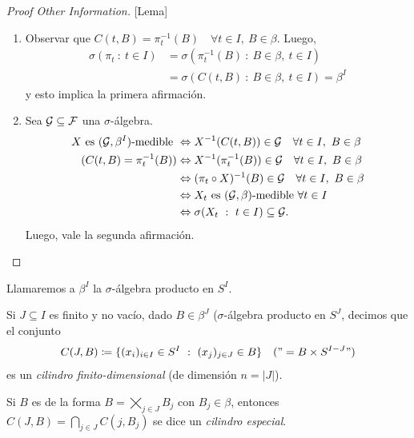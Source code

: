 \begin{proof}[Proof Other Information][Lema]
	\begin{enumerate}
		\item Observar que $C(t,B) = \pi_{t}^{-1}(B) \quad \forall t \in I,\ B \in \beta$. Luego,
		\begin{align*}
			\sigma(\pi_{t} \ : \ t \in I) &= \sigma(\pi_{t}^{-1}(B) \ : \ B \in \beta,\ t \in I) \\
			&= \sigma(C(t,B) \ : \ B \in \beta,\ t \in I) = \beta^{I}
		\end{align*}
		y esto implica la primera afirmación.

		\item Sea $\mathcal{G} \subseteq \mathcal{F}$ una $\sigma$-álgebra.
		\begin{align*}
			X \text{ es } (\mathcal{G}, \beta^{I}) \text{-medible } &\Leftrightarrow X^{-1}(C(t,B)) \in \mathcal{G} \quad \forall t \in I,\ B \in \beta \\
			(C(t,B) = \pi_{t}^{-1}(B)) &\Leftrightarrow X^{-1}(\pi_{t}^{-1}(B)) \in \mathcal{G} \quad \forall t \in I,\ B \in \beta \\
			&\Leftrightarrow (\pi_{t} \circ X)^{-1}(B) \in \mathcal{G} \quad \forall t \in I,\ B \in \beta \\
			&\Leftrightarrow X_{t} \text{ es } (\mathcal{G}, \beta)\text{-medible } \forall t \in I \\
			&\Leftrightarrow \sigma(X_{t} \ : \ t \in I) \subseteq \mathcal{G}
		.\end{align*}
		Luego, vale la segunda afirmación.
	\end{enumerate}
\end{proof}

\begin{note}
	Llamaremos a $\beta^{I}$ la $\sigma$-álgebra producto en $S^{I}$.
\end{note}

\begin{definition}
	Si $J \subseteq I$ es finito y no vacío, dado $B \in \beta^{J}$ ($\sigma$-álgebra producto en $S^{J}$, decimos que el conjunto
	\[ C(J, B) \coloneq \{(x_{i})_{i \in I} \in S^{I} \ : \ (x_{j})_{j \in J} \in B\}  \quad ("= B \times S^{I - J}") \]
	es un \textit{cilindro finito-dimensional} (de dimensión $n = |J|$). \par
	Si $B$ es de la forma $B = \bigtimes_{j \in J} B_{j}$ con $B_{j} \in \beta$, entonces $C(J,B) = \bigcap_{j \in J} C(j, B_{j})$ se dice un \textit{cilindro especial}.
\end{definition}
